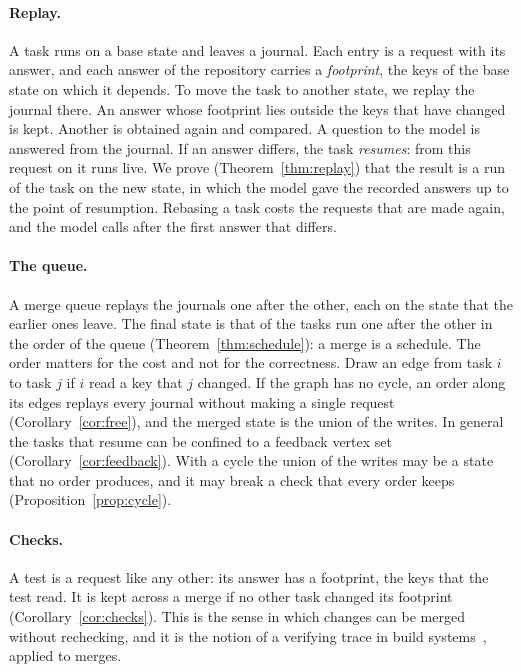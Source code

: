 \documentclass[acmsmall,nonacm,screen]{acmart}
\begin{document}
\paragraph{Replay.} A task runs on a base state and leaves a journal. Each entry is a request
with its answer, and each answer of the repository carries a \emph{footprint}, the keys of
the base state on which it depends. To move the task to another state, we replay the journal
there. An answer whose footprint lies outside the keys that have changed is kept. Another is
obtained again and compared. A question to the model is answered from the journal. If an
answer differs, the task \emph{resumes}: from this request on it runs live. We prove
(Theorem~\ref{thm:replay}) that the result is a run of the task on the new state, in which
the model gave the recorded answers up to the point of resumption. Rebasing a task costs the
requests that are made again, and the model calls after the first answer that differs.

\paragraph{The queue.} A merge queue replays the journals one after the other, each on the
state that the earlier ones leave. The final state is that of the tasks run one after the
other in the order of the queue (Theorem~\ref{thm:schedule}): a merge is a schedule. The
order matters for the cost and not for the correctness. Draw an edge from task $i$ to task
$j$ if $i$ read a key that $j$ changed. If the graph has no cycle, an order along its edges
replays every journal without making a single request (Corollary~\ref{cor:free}), and the
merged state is the union of the writes. In general the tasks that resume can be confined to
a feedback vertex set (Corollary~\ref{cor:feedback}). With a cycle the union of the writes
may be a state that no order produces, and it may break a check that every order keeps
(Proposition~\ref{prop:cycle}).

\paragraph{Checks.} A test is a request like any other: its answer has a footprint, the keys
that the test read. It is kept across a merge if no other task changed its footprint
(Corollary~\ref{cor:checks}). This is the sense in which changes can be merged without
rechecking, and it is the notion of a verifying trace in build systems~\citep{mokhov2018},
applied to merges.
\end{document}
